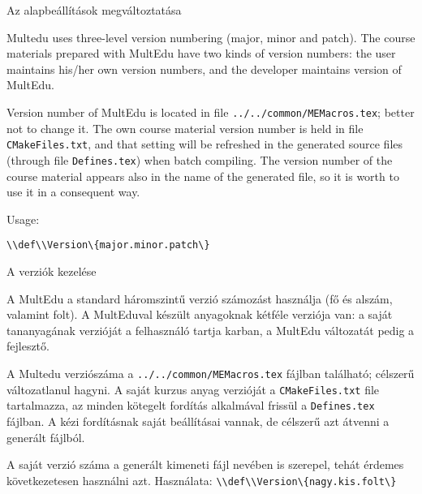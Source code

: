 
{
}
{Az alapbeállítások megváltoztatása}
{
}


{
Multedu uses three-level version numbering (major, minor and patch).
The course materials prepared with MultEdu have two kinds of version numbers: the user maintains his/her own version numbers, and the 
developer maintains version of MultEdu. 

Version number of MultEdu is located in file  \lstinline|../../common/MEMacros.tex|; better not to change it.
The own course material version number is held in file \lstinline|CMakeFiles.txt|, and that setting will be refreshed 
in the generated source files (through file \lstinline|Defines.tex|) when batch compiling.
The version number of the course material appears also in the name
of the generated file, so it is worth to use it in a consequent way.

Usage:
\par\noindent\lstinline|\\def\\Version\{major.minor.patch\}|
}
{A verziók kezelése}
{
A MultEdu a standard háromszintű verzió számozást használja (fő és alszám, valamint folt). A MultEduval készült anyagoknak kétféle 
verziója van: a saját tananyagának verzióját a felhasználó tartja karban, a MultEdu változatát pedig a fejlesztő.

A Multedu verziószáma a \lstinline|../../common/MEMacros.tex| fájlban található; célszerű változatlanul hagyni. 
A saját kurzus anyag verzióját a \lstinline|CMakeFiles.txt| file tartalmazza, az minden kötegelt fordítás alkalmával frissül a
\lstinline|Defines.tex| fájlban. A kézi fordításnak saját beállításai vannak, de célszerű azt átvenni a generált fájlból.

A saját verzió száma a generált kimeneti fájl nevében is szerepel,
tehát érdemes következetesen használni azt. Használata:
\lstinline|\\def\\Version\{nagy.kis.folt\}|
}


